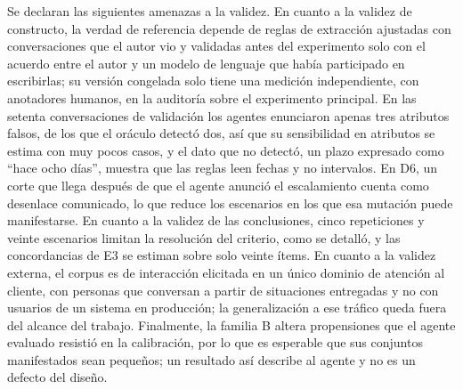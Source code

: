 Se declaran las siguientes amenazas a la validez. En cuanto a la validez de constructo, la verdad de referencia depende de reglas de extracción ajustadas con conversaciones que el autor vio y validadas antes del experimento solo con el acuerdo entre el autor y un modelo de lenguaje que había participado en escribirlas; su versión congelada solo tiene una medición independiente, con anotadores humanos, en la auditoría sobre el experimento principal. En las setenta conversaciones de validación los agentes enunciaron apenas tres atributos falsos, de los que el oráculo detectó dos, así que su sensibilidad en atributos se estima con muy pocos casos, y el dato que no detectó, un plazo expresado como ``hace ocho días'', muestra que las reglas leen fechas y no intervalos. En D6, un corte que llega después de que el agente anunció el escalamiento cuenta como desenlace comunicado, lo que reduce los escenarios en los que esa mutación puede manifestarse. En cuanto a la validez de las conclusiones, cinco repeticiones y veinte escenarios limitan la resolución del criterio, como se detalló, y las concordancias de E3 se estiman sobre solo veinte ítems. En cuanto a la validez externa, el corpus es de interacción elicitada en un único dominio de atención al cliente, con personas que conversan a partir de situaciones entregadas y no con usuarios de un sistema en producción; la generalización a ese tráfico queda fuera del alcance del trabajo. Finalmente, la familia B altera propensiones que el agente evaluado resistió en la calibración, por lo que es esperable que sus conjuntos manifestados sean pequeños; un resultado así describe al agente y no es un defecto del diseño.
\par
\endgroup
